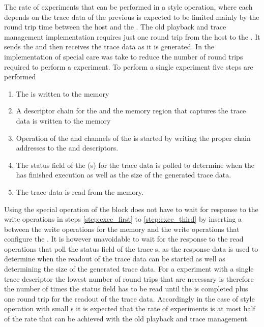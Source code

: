 The rate of experiments that can be performed in a \HWinTheLoop{} style operation, where each \PlaybackProgram{} depends on the trace data of the previous \PlaybackProgram{} is expected to be limited mainly by the round trip time between the host and the \FPGA{}. The old playback and trace management implementation requires just one round trip from the host to the \FPGA{}. It sends the \PlaybackProgram{} and then receives the trace data as it is generated.
In the implementation of \ayo{} special care was take to reduce the number of round trips required to perform a experiment. To perform a single experiment five steps are performed
\begin{enumerate}
    \item\label{step:exec_first} The \PlaybackProgram{} is written to the \DDR{} memory
    \item A descriptor{} chain for the \PlaybackProgram{} and the memory region that captures the trace data is written to the \descriptor{} memory
    \item\label{step:exec_third} Operation of the \SToMM{} and \MMToS{} channels of the \AXIDMA{} is started by writing the proper \descriptor{} chain addresses to the \curdesc{} and \taildesc{} descriptors.
    \item The status field of the \descriptor{}(s) for the trace data is polled to determine when the \PlaybackProgram{} has finished execution as well as the size of the generated trace data.
    \item The trace data is read from the \DDR{} memory.
\end{enumerate}
Using the special \globalfence{} operation of the \FAXI{} block \ayo{} does not have to wait for response to the write operations in steps \autoref{step:exec_first} to \autoref{step:exec_third} by inserting a \globalfence{} between the write operations for the \descriptor{} memory and the write operations that configure the \AXIDMA{}. It is however unavoidable to wait for the response to the read operations that poll the status field of the trace \descriptor{}s, as the response data is used to determine when the readout of the trace data can be started as well as determining the size of the generated trace data. For a experiment with a single trace descriptor the lowest number of round trips that are necessary is therefore the number of times the status field has to be read until the \PlaybackProgram{} is completed plus one round trip for the readout of the trace data.
Accordingly in the case of \HWinTheLoop{} style operation with small \PlaybackProgram{}s it is expected that the rate of experiments is at most half of the rate that can be achieved with the old playback and trace management.


